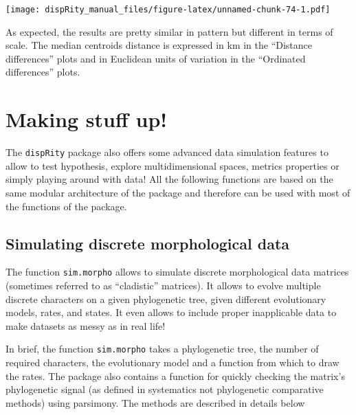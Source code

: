 \documentclass[]{book}
\theoremstyle{definition}
\theoremstyle{definition}
\theoremstyle{remark}
\begin{document}
\texttt{[image: dispRity\_manual\_files/figure-latex/unnamed-chunk-74-1.pdf]}

As expected, the results are pretty similar in pattern but different in
terms of scale. The median centroids distance is expressed in km in the
``Distance differences'' plots and in Euclidean units of variation in
the ``Ordinated differences'' plots.

\chapter{Making stuff up!}\label{making-stuff-up}

The \texttt{dispRity} package also offers some advanced data simulation
features to allow to test hypothesis, explore multidimensional spaces,
metrics properties or simply playing around with data! All the following
functions are based on the same modular architecture of the package and
therefore can be used with most of the functions of the package.

\section{Simulating discrete morphological
data}\label{simulating-discrete-morphological-data}

The function \texttt{sim.morpho} allows to simulate discrete
morphological data matrices (sometimes referred to as ``cladistic''
matrices). It allows to evolve multiple discrete characters on a given
phylogenetic tree, given different evolutionary models, rates, and
states. It even allows to include proper inapplicable data to make
datasets as messy as in real life!

In brief, the function \texttt{sim.morpho} takes a phylogenetic tree,
the number of required characters, the evolutionary model and a function
from which to draw the rates. The package also contains a function for
quickly checking the matrix's phylogenetic signal (as defined in
systematics not phylogenetic comparative methods) using parsimony. The
methods are described in details below
\end{document}

